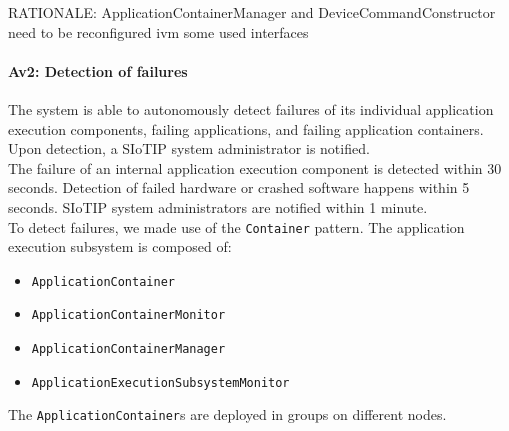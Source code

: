 
    RATIONALE: ApplicationContainerManager and DeviceCommandConstructor need to be
    reconfigured ivm some used interfaces

    \paragraph{Av2: Detection of failures}
        The system is able to autonomously detect failures of its individual
        application execution components, failing applications, and failing application containers. \\
        Upon detection, a SIoTIP system administrator is notified. \\
        The failure of an internal application execution component is detected within 30 seconds.
        Detection of failed hardware or crashed software happens within 5 seconds.
        SIoTIP system administrators are notified within 1 minute.\\

        To detect failures, we made use of the \texttt{Container} pattern.
        The application execution subsystem is composed of:
        \begin{itemize}
            \item \texttt{ApplicationContainer}
            \item \texttt{ApplicationContainerMonitor}
            \item \texttt{ApplicationContainerManager}
            \item \texttt{ApplicationExecutionSubsystemMonitor}
        \end{itemize}

        The \texttt{ApplicationContainer}s are deployed in groups on different nodes.

